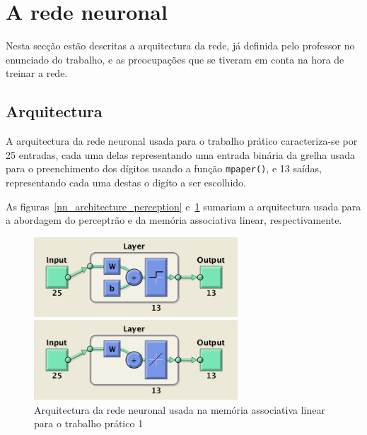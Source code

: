 \documentclass{article}
\begin{document}
\clearpage
\section{A rede neuronal}
Nesta secção estão descritas a arquitectura da rede, já definida pelo professor no enunciado do trabalho, e as preocupações que se tiveram em conta na hora de treinar a rede.

\subsection{Arquitectura}
A arquitectura da rede neuronal usada para o trabalho prático caracteriza-se por 25 entradas, cada uma delas representando uma entrada binária da grelha usada para o preenchimento dos dígitos usando a função \texttt{mpaper()}, e 13 saídas, representando cada uma destas o digíto a ser escolhido.

As figuras~\ref{nn_architecture_perception} e~\ref{nn_architecture_lam} sumariam a arquitectura usada para a abordagem do perceptrão e da memória associativa linear, respectivamente.

\begin{figure}[!h]
  \centering
  \includegraphics[width=3in]{figures/nn_architecture_perception}
  \caption{Arquitectura da rede neuronal usada no perceptrão para o trabalho prático 1}
  \label{nn_architecture_perception}
  
  \includegraphics[width=3in]{figures/nn_architecture_lam}
  \caption{Arquitectura da rede neuronal usada na memória associativa linear para o trabalho prático 1}
  \label{nn_architecture_lam}
\end{figure}
\end{document}
